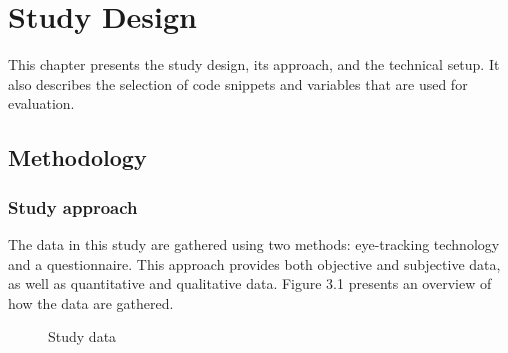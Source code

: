 \chapter{Study Design}

This chapter presents the study design, its approach, and the technical setup.  It also describes the selection of code snippets and variables that are used for evaluation.

\section{Methodology}

\subsection{Study approach} The data in this study are gathered using two methods: eye-tracking technology and a questionnaire. This approach provides both objective and subjective data, as well as quantitative and qualitative data. Figure 3.1 presents an overview of how the data are gathered. 



\begin{figure} [H]
  \centering
  
  \caption{Study data}
  \label{fig:AnhangsChor}




\end{figure}

